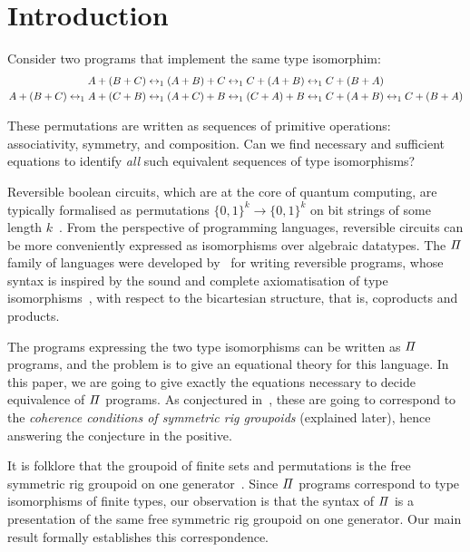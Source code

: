 \section{Introduction}
\label{sec:introduction}

Consider two programs that implement the same type isomorphim:
\begin{align*}
      A + (B + C) \leftrightarrow_1
      (A + B) + C & \leftrightarrow_1
      C + (A + B) \leftrightarrow_1
      C + (B + A)
      \\
      A + (B + C) \leftrightarrow_1
      A + (C + B) \leftrightarrow_1
      (A + C) + B & \leftrightarrow_1
      (C + A) + B \leftrightarrow_1
      C + (A + B) \leftrightarrow_1
      C + (B + A)
\end{align*}

These permutations are written as sequences of primitive operations: associativity, symmetry, and composition. Can we
find necessary and sufficient equations to identify \emph{all} such equivalent sequences of type isomorphisms?

Reversible boolean circuits, which are at the core of quantum computing, are typically formalised as permutations
$\{0,1\}^k \to \{0,1\}^k$ on bit strings of some length $k$~\cite{aaronson_et_al:LIPIcs:2017:8173,1201583}. From the
perspective of programming languages, reversible circuits can be more conveniently expressed as isomorphisms over
algebraic datatypes. The $\mathit{\Pi}$ family of languages were developed by~\citet*{James:2012:IE:2103656.2103667,theseus}
for writing reversible programs, whose syntax is inspired by the sound and complete axiomatisation of type
isomorphisms~\cite{fiore-remarks}, with respect to the bicartesian structure, that is, coproducts and products.

The programs expressing the two type isomorphisms can be written as $\mathit{\Pi}$ programs, and the problem is to give an
equational theory for this language. In this paper, we are going to give exactly the equations necessary to decide
equivalence of $\mathit{\Pi}$ programs. As conjectured in~\cite{caretteComputingSemiringsWeak2016}, these are going to
correspond to the \emph{coherence conditions of symmetric rig groupoids} (explained later), hence answering the
conjecture in the positive.

It is folklore that the groupoid of finite sets and permutations is the free symmetric rig groupoid on one
generator~\cite{laplaza72,kelly74,baez2000finite}. Since $\mathit{\Pi}$ programs correspond to type isomorphisms of finite
types, our observation is that the syntax of $\mathit{\Pi}$ is a presentation of the same free symmetric rig groupoid on one
generator. Our main result formally establishes this correspondence.

